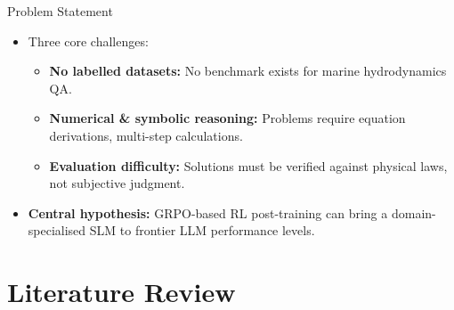 \documentclass[10pt]{beamer}
\begin{document}
\begin{frame}{Problem Statement}
\large
\begin{itemize}
    \item Three core challenges:
    \vspace{0.2cm}
    \begin{itemize}
        \item \textbf{No labelled datasets:} No benchmark exists for marine hydrodynamics QA.
        \vspace{0.15cm}
        \item \textbf{Numerical \& symbolic reasoning:} Problems require equation derivations, multi-step calculations.
        \vspace{0.15cm}
        \item \textbf{Evaluation difficulty:} Solutions must be verified against physical laws, not subjective judgment.
    \end{itemize}
    \vspace{0.3cm}

    \item \textbf{Central hypothesis:} GRPO-based RL post-training can bring a domain-specialised SLM to frontier LLM performance levels.
\end{itemize}
\end{frame}


\section{Literature Review}
\end{document}
